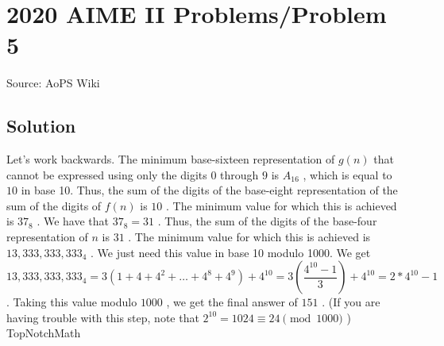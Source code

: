 \documentclass[12pt]{article}
\begin{document}
\section*{{2020 AIME II Problems/Problem 5}}
Source: AoPS Wiki

\subsection*{Solution}
Let's work backwards. The minimum base-sixteen representation of $g(n)$ that cannot be expressed using only the digits $0$ through $9$ is $A_{16}$ , which is equal to $10$ in base 10. Thus, the sum of the digits of the base-eight representation of the sum of the digits of $f(n)$ is $10$ . The minimum value for which this is achieved is $37_8$ . We have that $37_8 = 31$ . Thus, the sum of the digits of the base-four representation of $n$ is $31$ . The minimum value for which this is achieved is $13,333,333,333_4$ . We just need this value in base 10 modulo 1000. We get $13,333,333,333_4 = 3(1 + 4 + 4^2 + \dots + 4^8 + 4^9) + 4^{10} = 3\left(\dfrac{4^{10} - 1}{3}\right) + 4^{10} = 2*4^{10} - 1$ . Taking this value modulo $1000$ , we get the final answer of $\boxed{151}$ . (If you are having trouble with this step, note that $2^{10} = 1024 \equiv 24 \pmod{1000}$ ) ~ TopNotchMath
\end{document}
